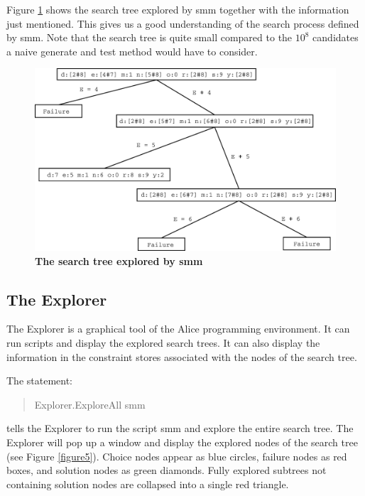 \documentclass[a4paper,halfparskip]{scrartcl}
\begin{document}
Figure \ref{figure4} shows the search tree explored by smm together 
with the information just mentioned. This gives us a good
understanding of the search process defined by smm. Note that the 
search tree is quite small compared to the $ 10^8 $ candidates a naive 
generate and test method would have to consider.


\begin{figure}[htpb]
\centerline{\includegraphics*[scale=0.3]{figs/fig5.eps}}
\caption{\textbf{The search tree explored by smm}}
\label{figure4}
\end{figure}

\subsection{The Explorer}
The Explorer is a graphical tool of the Alice programming
environment. It can run scripts and display the explored search
trees. It can also display the information in the constraint stores 
associated with the nodes of the search tree.

The statement:
\begin{quote}
Explorer.ExploreAll smm
\end{quote}
tells the Explorer to run the script smm and explore the entire search 
tree. The Explorer will pop up a window and display the explored nodes 
of the search tree (see Figure \ref{figure5}). Choice nodes appear 
as blue circles, failure nodes as red boxes, and solution nodes as
green diamonds. Fully explored subtrees not containing solution nodes 
are collapsed into a single red triangle. 
\end{document}
